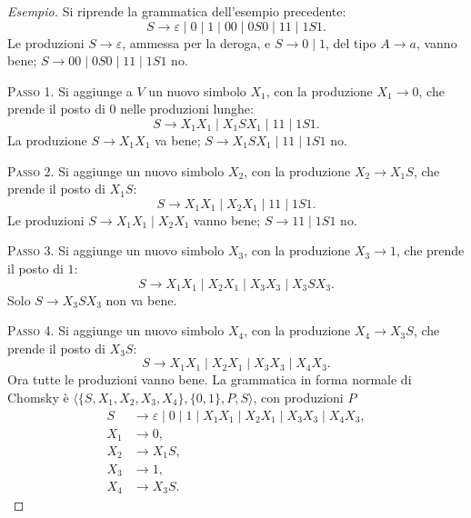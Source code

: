 \documentclass[a4paper, 11pt, oneside]{book}
\theoremstyle{formale}
\newenvironment{esempio}
    {\begin{proof}[\textit{Esempio}]\renewcommand{\qedsymbol}{$\diamond$}}
    {\end{proof}}
\begin{document}
    \begin{esempio}
        Si riprende la grammatica dell'esempio precedente:
        \begin{equation*}
            S \to \varepsilon \mid 0 \mid 1 \mid 00 \mid 0S0 \mid 11 \mid 1S1.
        \end{equation*}
        Le produzioni $S \to \varepsilon$, ammessa per la deroga, e $S \to 0 \mid 1$, del
        tipo $A \to a$, vanno bene; $S \to 00 \mid 0S0 \mid 11 \mid 1S1$ no.

        \textsc{Passo 1}. Si aggiunge a $V$ un nuovo simbolo $X_1$, con la produzione
        $X_1 \to 0$, che prende il posto di $0$ nelle produzioni lunghe:
        \begin{equation*}
            S \to X_1 X_1 \mid X_1 S X_1 \mid 11 \mid 1S1.
        \end{equation*}
        La produzione $S \to X_1 X_1$ va bene; $S \to X_1 S X_1 \mid 11 \mid 1S1$ no.

        \textsc{Passo 2}. Si aggiunge un nuovo simbolo $X_2$, con la produzione
        $X_2 \to X_1 S$, che prende il posto di $X_1 S$:
        \begin{equation*}
            S \to X_1 X_1 \mid X_2 X_1 \mid 11 \mid 1S1.
        \end{equation*}
        Le produzioni $S \to X_1 X_1 \mid X_2 X_1$ vanno bene; $S \to 11 \mid 1S1$ no.

        \textsc{Passo 3}. Si aggiunge un nuovo simbolo $X_3$, con la produzione
        $X_3 \to 1$, che prende il posto di $1$:
        \begin{equation*}
            S \to X_1 X_1 \mid X_2 X_1 \mid X_3 X_3 \mid X_3 S X_3.
        \end{equation*}
        Solo $S \to X_3 S X_3$ non va bene.

        \textsc{Passo 4}. Si aggiunge un nuovo simbolo $X_4$, con la produzione
        $X_4 \to X_3 S$, che prende il posto di $X_3 S$:
        \begin{equation*}
            S \to X_1 X_1 \mid X_2 X_1 \mid X_3 X_3 \mid X_4 X_3.
        \end{equation*}
        Ora tutte le produzioni vanno bene. La grammatica in forma normale di Chomsky \`e
        $\langle \{S, X_1, X_2, X_3, X_4\}, \{0, 1\}, P, S \rangle$, con produzioni $P$
        \begin{align*}
            S &\to \varepsilon \mid 0 \mid 1 \mid X_1 X_1 \mid X_2 X_1 \mid X_3 X_3
                \mid X_4 X_3, \\
            X_1 &\to 0, \\
            X_2 &\to X_1 S, \\
            X_3 &\to 1, \\
            X_4 &\to X_3 S.
        \end{align*}
    \end{esempio}
\end{document}
